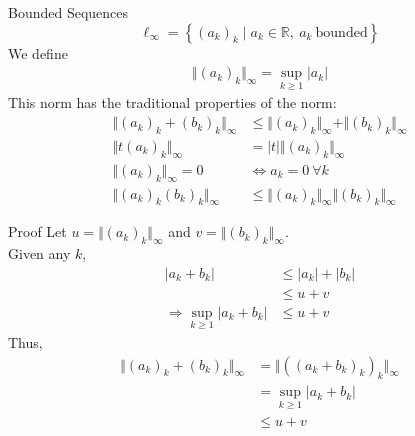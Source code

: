 \documentclass[8pt]{extarticle}
\newcommand{\R}{\mathbb{R}}
\begin{document}
  \begin{problem}{Bounded Sequences}
    \[
      \ell_{\infty} = \left\{(a_k)_k \mid a_k\in\R,~a_k~\text{bounded}\right\}
    \] 
    We define
    \begin{align*}
      \Vert(a_k)_k\Vert_{\infty} = \sup_{k\geq 1}|a_k|\tag*{Infinity Norm}
    \end{align*}
    This norm has the traditional properties of the norm:
    \begin{align*}
      \Vert (a_k)_k + (b_k)_k\Vert_{\infty} &\leq \Vert(a_k)_k\Vert_{\infty} + \Vert(b_k)_k\Vert_{\infty}\tag*{Triangle Inequality}\\
      \Vert t(a_k)_k\Vert_{\infty} &= |t|\Vert(a_k)_k\Vert_{\infty}\tag*{Scalar Multiplication}\\
      \Vert(a_k)_k\Vert_{\infty} = 0 &\Leftrightarrow a_k = 0~\forall k\tag*{Zero Property}\\
      \Vert(a_k)_k(b_k)_k\Vert_{\infty} &\leq \Vert(a_k)_k\Vert_{\infty}\Vert(b_k)_k\Vert_{\infty}\tag*{Multiplication}
    \end{align*}
    \begin{problem}{Proof}
      Let $u = \Vert(a_k)_k\Vert_{\infty}$ and $v = \Vert(b_k)_k\Vert_{\infty}$.\\

      Given any $k$,
      \begin{align*}
        |a_k + b_k| &\leq |a_k| + |b_k| \tag*{Triangle Inequality on $|\cdot|$}\\
                    &\leq u+v \tag*{definition of supremum}\\
        \Rightarrow \sup_{k\geq 1}|a_k + b_k|&\leq u+v
      \end{align*}
      Thus,
      \begin{align*}
        \Vert (a_k)_k + (b_k)_k\Vert_{\infty} &= \Vert \left((a_k + b_k)_k\right)_k\Vert_{\infty}\\
                                              &= \sup_{k\geq 1}|a_k + b_k|\\
                                              &\leq u+v
      \end{align*}
    \end{problem}
  \end{problem}
\end{document}
